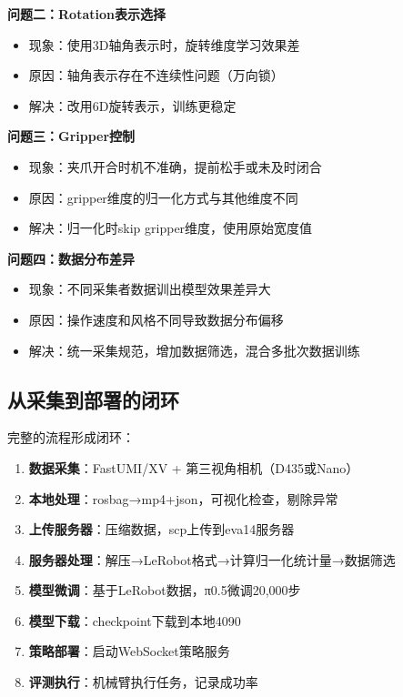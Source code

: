 \textbf{问题二：Rotation表示选择}
\begin{itemize}[leftmargin=2em]
    \item 现象：使用3D轴角表示时，旋转维度学习效果差
    \item 原因：轴角表示存在不连续性问题（万向锁）
    \item 解决：改用6D旋转表示，训练更稳定
\end{itemize}

\textbf{问题三：Gripper控制}
\begin{itemize}[leftmargin=2em]
    \item 现象：夹爪开合时机不准确，提前松手或未及时闭合
    \item 原因：gripper维度的归一化方式与其他维度不同
    \item 解决：归一化时skip gripper维度，使用原始宽度值
\end{itemize}

\textbf{问题四：数据分布差异}
\begin{itemize}[leftmargin=2em]
    \item 现象：不同采集者数据训出模型效果差异大
    \item 原因：操作速度和风格不同导致数据分布偏移
    \item 解决：统一采集规范，增加数据筛选，混合多批次数据训练
\end{itemize}

\subsection{从采集到部署的闭环}

完整的流程形成闭环：

\begin{enumerate}[leftmargin=2em]
    \item \textbf{数据采集}：FastUMI/XV + 第三视角相机（D435或Nano）
    \item \textbf{本地处理}：rosbag→mp4+json，可视化检查，剔除异常
    \item \textbf{上传服务器}：压缩数据，scp上传到eva14服务器
    \item \textbf{服务器处理}：解压→LeRobot格式→计算归一化统计量→数据筛选
    \item \textbf{模型微调}：基于LeRobot数据，π0.5微调20,000步
    \item \textbf{模型下载}：checkpoint下载到本地4090
    \item \textbf{策略部署}：启动WebSocket策略服务
    \item \textbf{评测执行}：机械臂执行任务，记录成功率
\end{enumerate}

